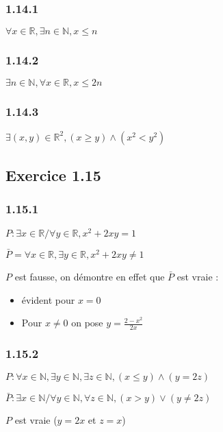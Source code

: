 \documentclass[a4paper,10pt]{report}
\begin{document}
\subsubsection*{1.14.1}
$\forall x \in \mathbb{R}, \exists n \in \mathbb{N}, x \leq n$
\subsubsection*{1.14.2}
$\exists n \in \mathbb{N}, \forall x  \in \mathbb{R}, x \leq 2n$
\subsubsection*{1.14.3}
$\exists(x,y) \in \mathbb{R}^2, (x \geq y) \wedge (x^2 < y^2)$


\subsection*{Exercice 1.15}
\subsubsection*{1.15.1}
$P : \exists x \in \mathbb{R} / \forall y \in \mathbb{R}, x^2 +2xy = 1$

$\bar{P} = \forall x \in \mathbb{R}, \exists y \in \mathbb{R}, x^2+2xy \neq 1$

$P$ est fausse, on démontre en effet que $\bar{P}$ est vraie :
\begin{itemize}
	\item évident pour $x=0$
	\item Pour $x \neq 0$ on pose $y=\frac{2-x^2}{2x}$
\end{itemize}

\subsubsection*{1.15.2}
$P: \forall x \in \mathbb{N}, \exists y \in \mathbb{N}, \exists z \in \mathbb{N}, (x\leq y) \wedge (y=2z)$

$\bar{P}: \exists x \in \mathbb{N} / \forall y \in \mathbb{N}, \forall z \in \mathbb{N}, (x > y) \vee (y \neq 2z)$

$P$ est vraie ($y=2x$ et $z=x$)
\end{document}
